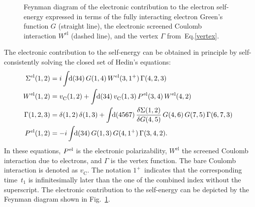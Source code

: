 \begin{figure}[t]
\centering
{}
\caption[Feynman diagram of the electronic contribution to the electron self-energy.]{Feynman diagram of the electronic contribution to the electron self-energy expressed in terms of the fully
interacting electron Green’s function $G$ (straight line), the
electronic screened Coulomb interaction $W^\text{el}$ (dashed line), and the vertex $\Gamma$ from~Eq.\;\eqref{vertex}.\label{el_self_en}}
\end{figure}
%
The electronic contribution to the self-energy can be obtained in principle by self-consistently solving the closed set of Hedin's equations\cite{hedin1965new}:
%
 \begin{align}
      \Sigma^\text{el}(1,2) & = i\int\text{\!\!d}(34)\,G(1,4)\,W^\text{el}(3,1^+)\,\Gamma(4,2,3)\label{sigma_el}\\
    W^\text{el}(1,2) & = v_\text{C}^{\phantom{I}}(1,2) + \int\text{\!\!d}(34)\,v_\text{C}^{\phantom{I}}(1,3)\, P^{\hspace{.2mm}\text{el}}(3,4)\,W^\text{el}(4,2) \label{dyson_w}\\
     \Gamma(1,2,3) & = \delta(1,2)\,\delta(1,3) + \int\text{\!\!d}(4567)\,\frac{\delta\Sigma(1,2)}{\delta G(4,5)}\,G(4,6)\,G(7,5)\,\Gamma(6,7,3)\label{vertex}\\
     P^{\hspace{.2mm}\text{el}}(1,2) & = -i\int\text{\!\!d}(34)\,G(1,3)\,G(4,1^+)\,\Gamma(3,4,2).
 \end{align}
In these equations, $ P^{\hspace{.2mm}\text{el}}$ is the electronic polarizability, $W^\text{el}$ the screened Coulomb interaction due to electrons, and $\Gamma$ is the vertex function. The bare Coulomb interaction is denoted as  $v_\text{C}^{\phantom{I}}$. The notation \ldq$1^+$\rdq~indicates that the corresponding time~$t_1$ is infinitesimally later than the one of the combined index without the superscript. The electronic contribution to the self-energy can be depicted by the Feynman diagram shown in Fig.~\ref{el_self_en}.


